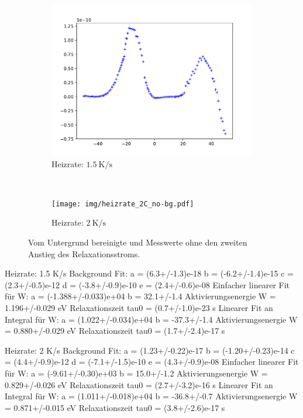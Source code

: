 \begin{figure}[htp]
    \centering
    \begin{subfigure}[t]{0.5\textwidth}
        \centering
        \includegraphics[width=\textwidth]{img/heizrate_15C_no-bg.pdf}
        \caption{Heizrate: $\SI{1.5}{\kelvin\per\second}$}
    \end{subfigure}%
    ~
    \begin{subfigure}[t]{0.5\textwidth}
        \centering
        \texttt{[image: img/heizrate\_2C\_no-bg.pdf]}
        \caption{Heizrate: $\SI{2}{\kelvin\per\second}$}
    \end{subfigure}
    \caption{Vom Untergrund bereinigte und Messwerte ohne den zweiten Anstieg des Relaxationsstroms.}
\end{figure}

Heizrate: 1.5 K/s
Background Fit:
a = (6.3+/-1.3)e-18
b = (-6.2+/-1.4)e-15
c = (2.3+/-0.5)e-12
d = (-3.8+/-0.9)e-10
e = (2.4+/-0.6)e-08
Einfacher linearer Fit für W:
a = (-1.388+/-0.033)e+04
b = 32.1+/-1.4
Aktivierungsenergie W = 1.196+/-0.029 eV
Relaxationszeit tau0 = (0.7+/-1.0)e-23 s
Linearer Fit an Integral für W:
a = (1.022+/-0.034)e+04
b = -37.3+/-1.4
Aktivierungsenergie W = 0.880+/-0.029 eV
Relaxationszeit tau0 = (1.7+/-2.4)e-17 s

Heizrate: 2 K/s
Background Fit:
a = (1.23+/-0.22)e-17
b = (-1.20+/-0.23)e-14
c = (4.4+/-0.9)e-12
d = (-7.1+/-1.5)e-10
e = (4.3+/-0.9)e-08
Einfacher linearer Fit für W:
a = (-9.61+/-0.30)e+03
b = 15.0+/-1.2
Aktivierungsenergie W = 0.829+/-0.026 eV
Relaxationszeit tau0 = (2.7+/-3.2)e-16 s
Linearer Fit an Integral für W:
a = (1.011+/-0.018)e+04
b = -36.8+/-0.7
Aktivierungsenergie W = 0.871+/-0.015 eV
Relaxationszeit tau0 = (3.8+/-2.6)e-17 s

